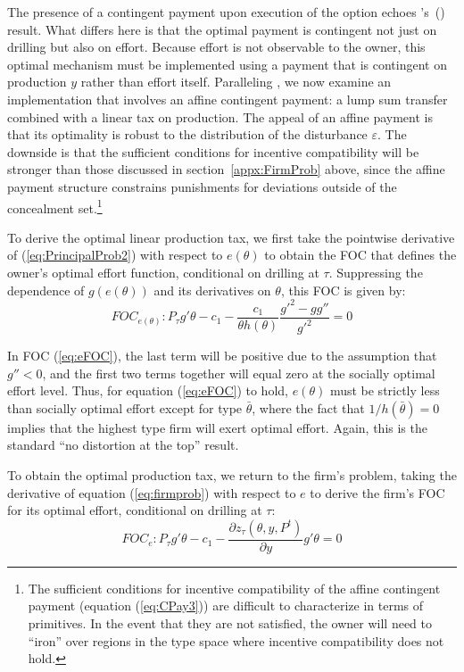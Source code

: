 \documentclass[12pt]{article}
\newcommand\cites[1]{\citeauthor{#1}'s\ (\citeyear{#1})}
\begin{document}
The presence of a contingent payment upon execution of the option echoes \cites{bib:board} result. What differs here is that the optimal payment is contingent not just on drilling but also on effort. Because effort is not observable to the owner, this optimal mechanism must be implemented using a payment that is contingent on production $y$ rather than effort itself. Paralleling \citet{bib:laffonttirole1986}, we now examine an implementation that involves an affine contingent payment: a lump sum transfer combined with a linear tax on production. The appeal of an affine payment is that its optimality is robust to the distribution of the disturbance $\varepsilon$. The downside is that the sufficient conditions for incentive compatibility will be stronger than those discussed in section~\ref{appx:FirmProb} above, since the affine payment structure constrains punishments for deviations outside of the concealment set.\footnote{The sufficient conditions for incentive compatibility of the affine contingent payment (equation (\ref{eq:CPay3})) are difficult to characterize in terms of primitives. In the event that they are not satisfied, the owner will need to ``iron'' over regions in the type space where incentive compatibility does not hold.\label{fn:affinesuf}}

To derive the optimal linear production tax, we first take the pointwise derivative of (\ref{eq:PrincipalProb2}) with respect to $e(\theta)$ to obtain the FOC that defines the owner's optimal effort function, conditional on drilling at $\tau$. Suppressing the dependence of $g(e(\theta))$ and its derivatives on $\theta$, this FOC is given by:
\begin{equation}
FOC_{e(\theta)}: P_\tau g'\theta-c_1-\frac{c_1}{\theta h(\theta)}\frac{g'^2-gg''}{g'^2}=0 \label{eq:eFOC}
\end{equation}

In FOC (\ref{eq:eFOC}), the last term will be positive due to the assumption that $g''<0$, and the first two terms together will equal zero at the socially optimal effort level. Thus, for equation (\ref{eq:eFOC}) to hold, $e(\theta)$ must be strictly less than socially optimal effort except for type $\bar{\theta}$, where the fact that $1/h(\bar{\theta})=0$ implies that the highest type firm will exert optimal effort. Again, this is the standard ``no distortion at the top'' result.

To obtain the optimal production tax, we return to the firm's problem, taking the derivative of equation (\ref{eq:firmprob}) with respect to $e$ to derive the firm's FOC for its optimal effort, conditional on drilling at $\tau$:
\begin{equation}
FOC_e: P_\tau g'\theta-c_1 - \frac{\partial z_\tau(\theta,y,P^t)}{\partial y}g'\theta = 0 \label{eq:FirmeFOC}
\end{equation}
\end{document}
